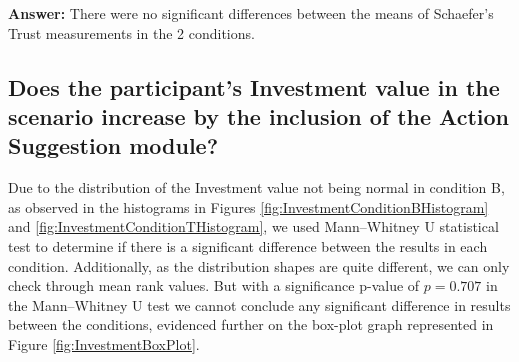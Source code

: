 \textbf{Answer:} There were no significant differences between the means of Schaefer's Trust measurements in the 2 conditions.


\subsection*{Does the participant's Investment value in the scenario increase by the inclusion of the Action Suggestion module?}
Due to the distribution of the Investment value not being normal in condition B, as observed in the histograms in Figures \ref{fig:InvestmentConditionBHistogram} and \ref{fig:InvestmentConditionTHistogram}, we used Mann–Whitney U statistical test to determine if there is a significant difference between the results in each condition. Additionally, as the distribution shapes are quite different, we can only check through mean rank values. But with a significance p-value of $p=0.707$ in the Mann–Whitney U test we cannot conclude any significant difference in results between the conditions, evidenced further on the box-plot graph represented in Figure \ref{fig:InvestmentBoxPlot}.



